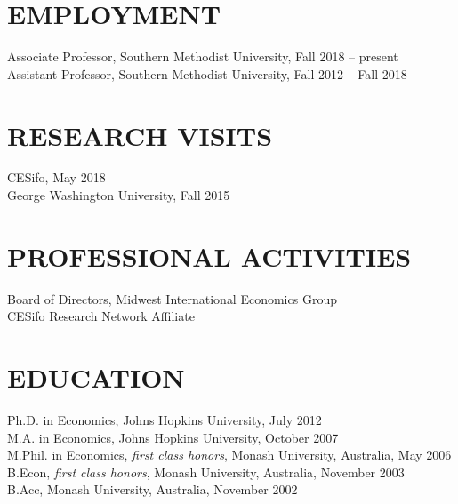 \documentclass[11pt]{res}
\begin{document}
\begin{resume}
\hspace{-0.5in}\makebox[6.1in]{\hrulefill}

\section{EMPLOYMENT} \vspace{1.5mm}
Associate Professor, Southern Methodist University, Fall 2018 -- present\\
Assistant Professor, Southern Methodist University, Fall 2012 -- Fall 2018

\section{RESEARCH VISITS} \vspace{1.5mm}
CESifo, May 2018\vspace{1.5mm}\\
George Washington University, Fall 2015

\section{PROFESSIONAL ACTIVITIES} \vspace{1.5mm}
Board of Directors, Midwest International Economics Group\\
CESifo Research Network Affiliate

\section{EDUCATION} \vspace{1.5mm}
    Ph.D. in Economics, Johns Hopkins University, July 2012 \vspace{1.5mm}\\
    M.A. in Economics, Johns Hopkins University, October 2007\vspace{1.5mm}\\
    M.Phil. in Economics, \emph{first class honors}, Monash University, Australia, May 2006\vspace{1.5mm}\\
    B.Econ, \emph{first class honors}, Monash University, Australia, November 2003\vspace{1.5mm}\\
    B.Acc, Monash University, Australia, November 2002



\end{resume}
\end{document}
